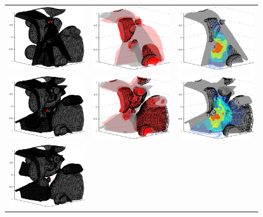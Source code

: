 \begin{figure}
\begin{tabular}{ccc}
\includegraphics[width=1.5in]{view_01}&
\includegraphics[width=1.5in]{marginal_01}&
\includegraphics[width=1.5in]{energy_01}\\
\includegraphics[width=1.5in]{view_02}&
\includegraphics[width=1.5in]{marginal_02}&
\includegraphics[width=1.5in]{energy_02}\\
\includegraphics[width=1.5in]{view_03}&

\end{tabular}
\end{figure}
